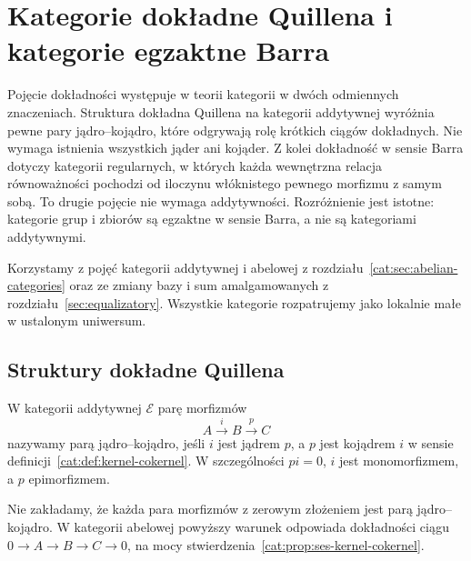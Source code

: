 \section{Kategorie dokładne Quillena i kategorie egzaktne Barra}\label{cat:sec:exact-quillen-barr}

Pojęcie dokładności występuje w teorii kategorii w dwóch odmiennych znaczeniach. Struktura dokładna Quillena na kategorii addytywnej wyróżnia pewne pary jądro--kojądro, które odgrywają rolę krótkich ciągów dokładnych. Nie wymaga istnienia wszystkich jąder ani kojąder. Z kolei dokładność w sensie Barra dotyczy kategorii regularnych, w których każda wewnętrzna relacja równoważności pochodzi od iloczynu włóknistego pewnego morfizmu z samym sobą. To drugie pojęcie nie wymaga addytywności. Rozróżnienie jest istotne: kategorie grup i zbiorów są egzaktne w sensie Barra, a nie są kategoriami addytywnymi.

Korzystamy z pojęć kategorii addytywnej i abelowej z rozdziału~\ref{cat:sec:abelian-categories} oraz ze zmiany bazy i sum amalgamowanych z rozdziału~\ref{sec:equalizatory}. Wszystkie kategorie rozpatrujemy jako lokalnie małe w ustalonym uniwersum.

\subsection{Struktury dokładne Quillena}

\begin{definicja}\label{cat:def:exact-kernel-cokernel}
W kategorii addytywnej $\mathcal E$ parę morfizmów
\[
 A\xrightarrow{i}B\xrightarrow{p}C
\]
nazywamy parą jądro--kojądro, jeśli $i$ jest jądrem $p$, a $p$ jest kojądrem $i$ w sensie definicji~\ref{cat:def:kernel-cokernel}. W szczególności $pi=0$, $i$ jest monomorfizmem, a $p$ epimorfizmem.
\end{definicja}

Nie zakładamy, że każda para morfizmów z zerowym złożeniem jest parą jądro--kojądro. W kategorii abelowej powyższy warunek odpowiada dokładności ciągu $0\to A\to B\to C\to0$, na mocy stwierdzenia~\ref{cat:prop:ses-kernel-cokernel}.

